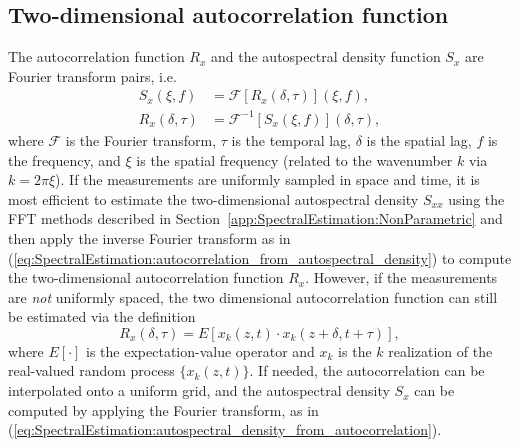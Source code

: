 \subsection{Two-dimensional autocorrelation function}
The autocorrelation function $R_{x}$ and
the autospectral density function $S_{x}$
are Fourier transform pairs, i.e.\
\begin{align}
  S_{x}(\xi, f)
  &=
  \mathcal{F}[R_{x}(\delta, \tau)](\xi, f),
  \label{eq:SpectralEstimation:autospectral_density_from_autocorrelation}
  \\
  R_{x}(\delta, \tau)
  &=
  \mathcal{F}^{-1}[S_{x}(\xi, f)](\delta, \tau),
  \label{eq:SpectralEstimation:autocorrelation_from_autospectral_density}
\end{align}
where
$\mathcal{F}$ is the Fourier transform,
$\tau$ is the temporal lag,
$\delta$ is the spatial lag,
$f$ is the frequency, and
$\xi$ is the spatial frequency
(related to the wavenumber $k$ via $k = 2 \pi \xi$).
If the measurements are uniformly sampled in space and time,
it is most efficient to estimate
the two-dimensional autospectral density $S_{xx}$
using the FFT methods described in
Section~\ref{app:SpectralEstimation:NonParametric} and
then apply the inverse Fourier transform
as in (\ref{eq:SpectralEstimation:autocorrelation_from_autospectral_density})
to compute the two-dimensional autocorrelation function $R_{x}$.
However, if the measurements are \emph{not} uniformly spaced,
the two dimensional autocorrelation function
can still be estimated via the definition
\begin{equation}
  R_{x}(\delta, \tau)
  =
  E[x_k(z, t) \cdot x_k(z + \delta, t + \tau)],
  \label{eq:SpectralEstimation:autocorrelation_definition}
\end{equation}
where $E[\cdot]$ is the expectation-value operator and
$x_k$ is the $k$ realization
of the real-valued random process $\{x_k(z, t)\}$.
If needed, the autocorrelation can be interpolated onto a uniform grid, and
the autospectral density $S_{x}$ can be computed
by applying the Fourier transform,
as in (\ref{eq:SpectralEstimation:autospectral_density_from_autocorrelation}).

